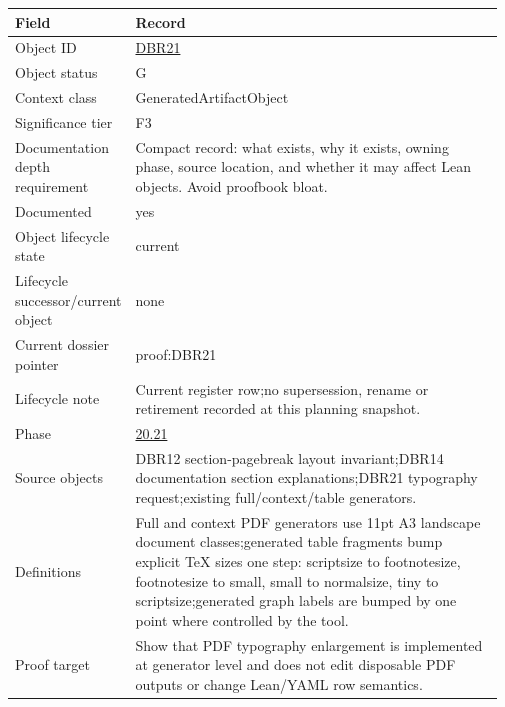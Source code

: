 \begin{longtable}{L{0.16\linewidth} L{0.81\linewidth}}
\hline
\textbf{Field} & \textbf{Record}\\
\hline
Object ID & \hyperlink{object-row-DBR21}{DBR21}\\
\hline\addlinespace[0.20em]
Object status & G\\
\hline\addlinespace[0.20em]
Context class & GeneratedArtifactObject\\
\hline\addlinespace[0.20em]
Significance tier & F3\\
\hline\addlinespace[0.20em]
Documentation depth requirement & Compact record: what exists, why it exists, owning phase, source location, and whether it may affect Lean objects. Avoid proofbook bloat.\\
\hline\addlinespace[0.20em]
Documented & yes\\
\hline\addlinespace[0.20em]
Object lifecycle state & current\\
\hline\addlinespace[0.20em]
Lifecycle successor/\allowbreak{}current object & none\\
\hline\addlinespace[0.20em]
Current dossier pointer & proof:DBR21\\
\hline\addlinespace[0.20em]
Lifecycle note & Current register row;\newline no supersession, rename or retirement recorded at this planning snapshot.\\
\hline\addlinespace[0.20em]
Phase & \hyperlink{phase-row-20-21}{20.21}\\
\hline\addlinespace[0.20em]
Source objects & DBR12 section-pagebreak layout invariant;\newline DBR14 documentation section explanations;\newline DBR21 typography request;\newline existing full/\allowbreak{}context/\allowbreak{}table generators.\\
\hline\addlinespace[0.20em]
Definitions & Full and context PDF generators use 11pt A3 landscape document classes;\newline generated table fragments bump explicit TeX sizes one step: scriptsize to footnotesize, footnotesize to small, small to normalsize, tiny to scriptsize;\newline generated graph labels are bumped by one point where controlled by the tool.\\
\hline\addlinespace[0.20em]
Proof target & Show that PDF typography enlargement is implemented at generator level and does not edit disposable PDF outputs or change Lean/\allowbreak{}YAML row semantics.\\

\end{longtable}
